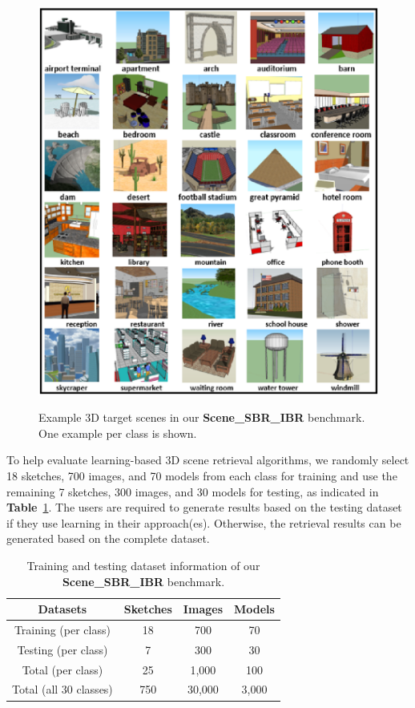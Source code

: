 \documentclass[times, 10pt,twocolumn]{article}
\begin{document}
\begin{figure}[htb]
\centering
{
\includegraphics[width=1.0\linewidth]{SampleModels}
}
\caption{Example 3D target scenes in our \textbf{Scene\_SBR\_IBR} benchmark. One example per class is shown.}
\label{BenchmarkSceneExamples}
\end{figure}

To help evaluate learning-based 3D scene retrieval algorithms, we randomly select 18 sketches, 700 images, and 70 models from each class for training and use the remaining 7 sketches, 300 images, and 30 models for testing, as indicated in \textbf{Table}~\ref{table1}. The users are required to generate results based on the testing dataset if they use learning in their approach(es). Otherwise, the retrieval results can be generated based on the complete dataset.

\begin{table}[htb]
\centering
\caption {Training and testing dataset information of our \textbf{Scene\_SBR\_IBR} benchmark.}
\begin{center}
\begin{tabular}  {|c|c|c|c|}
 \hline
 \textbf{Datasets} & \textbf{Sketches} &\textbf{Images} & \textbf{Models} \\
 \hline
 \normalsize{Training (per class)}  & 18 &700  & 70  \\
 \hline
 \normalsize{Testing (per class)}  & 7 &300   & 30  \\
  \hline
 \normalsize{Total (per class)}  & 25 &1,000 & 100  \\
\hline
 \normalsize{Total (all 30 classes)}  &750 &30,000 & 3,000  \\
\hline
\end{tabular}
\end{center}
\label{table1}
\end{table}
\end{document}
